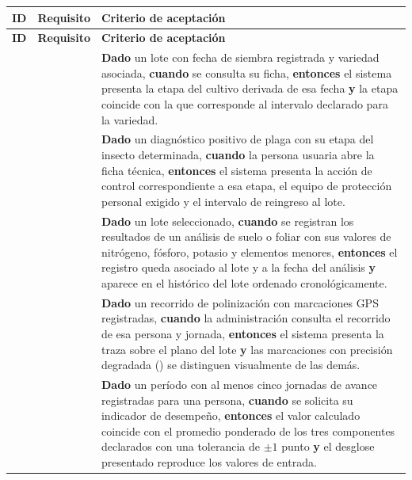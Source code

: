 \begin{longtable}{|C{1.5cm}|C{1.5cm}|L{12.4cm}|}
\hline
{}\textbf{ID} & \textbf{Requisito} & \textbf{Criterio de aceptación}\\ \hline
\endfirsthead
\hline
{}\textbf{ID} & \textbf{Requisito} & \textbf{Criterio de aceptación}\\ \hline
\endhead

 &  & \textbf{Dado} un lote con fecha de siembra registrada y variedad asociada, \textbf{cuando} se consulta su ficha, \textbf{entonces} el sistema presenta la etapa del cultivo derivada de esa fecha \textbf{y} la etapa coincide con la que corresponde al intervalo declarado para la variedad. \\ \hline

 &  & \textbf{Dado} un diagnóstico positivo de plaga con su etapa del insecto determinada, \textbf{cuando} la persona usuaria abre la ficha técnica, \textbf{entonces} el sistema presenta la acción de control correspondiente a esa etapa, el equipo de protección personal exigido y el intervalo de reingreso al lote. \\ \hline

 &  & \textbf{Dado} un lote seleccionado, \textbf{cuando} se registran los resultados de un análisis de suelo o foliar con sus valores de nitrógeno, fósforo, potasio y elementos menores, \textbf{entonces} el registro queda asociado al lote y a la fecha del análisis \textbf{y} aparece en el histórico del lote ordenado cronológicamente. \\ \hline

 &  & \textbf{Dado} un recorrido de polinización con marcaciones GPS registradas, \textbf{cuando} la administración consulta el recorrido de esa persona y jornada, \textbf{entonces} el sistema presenta la traza sobre el plano del lote \textbf{y} las marcaciones con precisión degradada () se distinguen visualmente de las demás. \\ \hline

 &  & \textbf{Dado} un período con al menos cinco jornadas de avance registradas para una persona, \textbf{cuando} se solicita su indicador de desempeño, \textbf{entonces} el valor calculado coincide con el promedio ponderado de los tres componentes declarados con una tolerancia de $\pm 1$ punto \textbf{y} el desglose presentado reproduce los valores de entrada. \\ \hline


\end{longtable}
